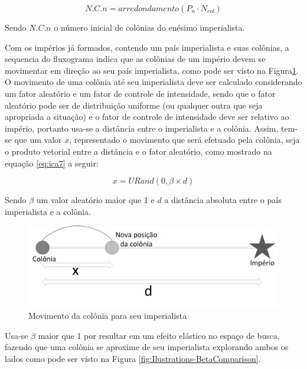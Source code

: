 \begin{equation}
\label{eq:ica6}
N.C.n = arredondamento ( P_{n} \cdot N_{col})
\end{equation}

Sendo \(N.C.n\) o número inicial de colônias do enésimo imperialista.

Com os impérios já formados, contendo um país imperialista e suas colônias, a sequencia do fluxograma indica que as colônias de um império devem se movimentar em direção ao seu país imperialista, como pode ser visto na Figura\ref{fig:Ilustrations-ColonyEmpireMove}. O movimento de uma colônia até seu imperialista deve ser calculado considerando um fator aleatório e um fator de controle de intensidade, sendo que o fator aleatório pode ser de distribuição uniforme (ou qualquer outra que seja apropriada a situação) e  o fator de controle de intensidade deve ser relativo ao império, portanto usa-se a distância entre o imperialista e a colônia. Assim, tem-se que um valor \(x\), representado o movimento que será efetuado pela colônia, seja o produto vetorial entre a distância e o fator aleatório, como mostrado na equação \ref{eq:ica7} a seguir:

\begin{equation}
\label{eq:ica7}
x  = URand(0, \beta \times d)
\end{equation}

Sendo \(\beta\) um valor aleatório maior que 1 e \(d\) a distância absoluta entre o país imperialista e a colônia.

\begin{figure}[h]
	\centering	
	\includegraphics[scale=0.5]{Figuras/Ilustrations-ColonyEmpireMove.png}
	\caption{Movimento da colônia para seu imperialista}
	\label{fig:Ilustrations-ColonyEmpireMove}
\end{figure}

Usa-se \(\beta\) maior que 1 por resultar em um efeito elástico no espaço de busca, fazendo que uma colônia se aproxime de seu imperialista explorando ambos os lados como pode ser visto na Figura \ref{fig:Ilustrations-BetaComparison}. 

